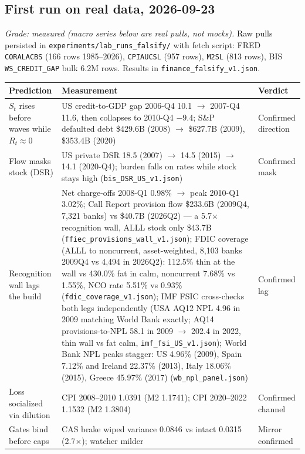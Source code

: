 \documentclass[11pt]{article}
\begin{document}
\subsection{First run on real data, 2026-09-23}

\textit{Grade: measured (macro series below are real pulls, not mocks).} Raw pulls persisted in \texttt{experiments/lab\_runs\_falsify/} with fetch script: FRED \texttt{CORALACBS} (166 rows 1985--2026), \texttt{CPIAUCSL} (957 rows), \texttt{M2SL} (813 rows), BIS \texttt{WS\_CREDIT\_GAP} bulk 6.2M rows. Results in \texttt{finance\_falsify\_v1.json}.

\begin{center}
\small
\begin{tabular}{p{2.6cm}p{4.2cm}p{4.6cm}}
\toprule
Prediction & Measurement & Verdict \\
\midrule
$S_t$ rises before waves while $R_t\approx0$ & US credit-to-GDP gap 2006-Q4 10.1 $\to$ 2007-Q4 11.6, then collapses to 2010-Q4 $-9.4$; S\&P defaulted debt \$429.6B (2008) $\to$ \$627.7B (2009), \$353.4B (2020) \citep{sp2025} & Confirmed direction \\
Flow masks stock (DSR) & US private DSR 18.5 (2007) $\to$ 14.5 (2015) $\to$ 14.1 (2020-Q4); burden falls on rates while stock stays high (\texttt{bis\_DSR\_US\_v1.json}) & Confirmed mask \\
Recognition wall lags the build & Net charge-offs 2008-Q1 0.98\% $\to$ peak 2010-Q1 3.02\%; Call Report provision flow \$233.6B (2009Q4, 7,321 banks) vs \$40.7B (2026Q2) --- a 5.7$\times$ recognition wall, ALLL stock only \$43.7B (\texttt{ffiec\_provisions\_wall\_v1.json}); FDIC coverage (ALLL to noncurrent, asset-weighted, 8,103 banks 2009Q4 vs 4,494 in 2026Q2): 112.5\% thin at the wall vs 430.0\% fat in calm, noncurrent 7.68\% vs 1.55\%, NCO rate 5.51\% vs 0.93\% (\texttt{fdic\_coverage\_v1.json}); IMF FSIC cross-checks both legs independently (USA AQ12 NPL 4.96 in 2009 matching World Bank exactly; AQ14 provisions-to-NPL 58.1 in 2009 $\to$ 202.4 in 2022, thin wall vs fat calm, \texttt{imf\_fsi\_US\_v1.json}); World Bank NPL peaks stagger: US 4.96\% (2009), Spain 7.12\% and Ireland 22.37\% (2013), Italy 18.06\% (2015), Greece 45.97\% (2017) (\texttt{wb\_npl\_panel.json}) & Confirmed lag \\
Loss socialized via dilution & CPI 2008--2010 1.0391 (M2 1.1741); CPI 2020--2022 1.1532 (M2 1.3804) & Confirmed channel \\
Gates bind before caps & CAS brake wiped variance 0.0846 vs intact 0.0315 (2.7$\times$); watcher milder & Mirror confirmed \\

\end{tabular}
\end{center}
\end{document}
